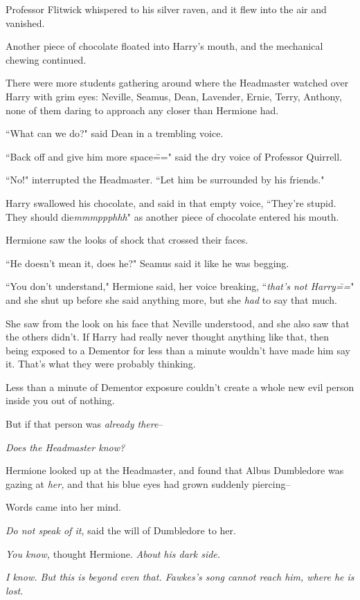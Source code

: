 Professor Flitwick whispered to his silver raven, and it flew into the air and vanished.

Another piece of chocolate floated into Harry's mouth, and the mechanical chewing continued.

There were more students gathering around where the Headmaster watched over Harry with grim eyes: Neville, Seamus, Dean, Lavender, Ernie, Terry, Anthony, none of them daring to approach any closer than Hermione had.

``What can we do?" said Dean in a trembling voice.

``Back off and give him more space\===" said the dry voice of Professor Quirrell.

``No!" interrupted the Headmaster. ``Let him be surrounded by his friends."

Harry swallowed his chocolate, and said in that empty voice, ``They're stupid. They should die\emph{mmmppphhh}" as another piece of chocolate entered his mouth.

Hermione saw the looks of shock that crossed their faces.

``He doesn't mean it, does he?" Seamus said it like he was begging.

``You don't understand," Hermione said, her voice breaking, ``\emph{that's not Harry\===}" and she shut up before she said anything more, but she \emph{had} to say that much.

She saw from the look on his face that Neville understood, and she also saw that the others didn't. If Harry had really never thought anything like that, then being exposed to a Dementor for less than a minute wouldn't have made him say it. That's what they were probably thinking.

Less than a minute of Dementor exposure couldn't create a whole new evil person inside you out of nothing.

But if that person was \emph{already there}\---

\emph{Does the Headmaster know?}

Hermione looked up at the Headmaster, and found that Albus Dumbledore was gazing at \emph{her,} and that his blue eyes had grown suddenly piercing\---

Words came into her mind.

\emph{Do not speak of it,} said the will of Dumbledore to her.

\emph{You know,} thought Hermione. \emph{About his dark side.}

\emph{I know. But this is beyond even that. Fawkes's song cannot reach him, where he is lost.}

